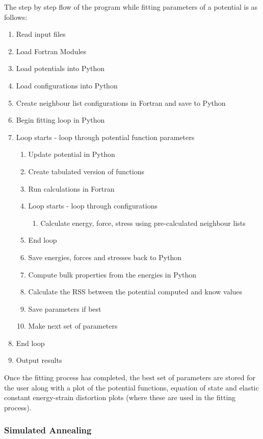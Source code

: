 The step by step flow of the program while fitting parameters of a potential is as follows:

\begin{enumerate}
\item Read input files
\item Load Fortran Modules
\item Load potentials into Python
\item Load configurations into Python
\item Create neighbour list configurations in Fortran and save to Python
\item Begin fitting loop in Python
\item Loop starts - loop through potential function parameters
\begin{enumerate}
\item Update potential in Python
\item Create tabulated version of functions
\item Run calculations in Fortran
\item Loop starts - loop through configurations
\begin{enumerate}
\item Calculate energy, force, stress using pre-calculated neighbour lists
\end{enumerate}
\item End loop
\item Save energies, forces and stresses back to Python
\item Compute bulk properties from the energies in Python
\item Calculate the RSS between the potential computed and know values
\item Save parameters if best
\item Make next set of parameters
\end{enumerate}
\item End loop
\item Output results
\end{enumerate}

Once the fitting process has completed, the best set of parameters are stored for the user along with a plot of the potential functions, equation of state and elastic constant energy-strain distortion plots (where these are used in the fitting process).




\subsubsection{Simulated Annealing}

